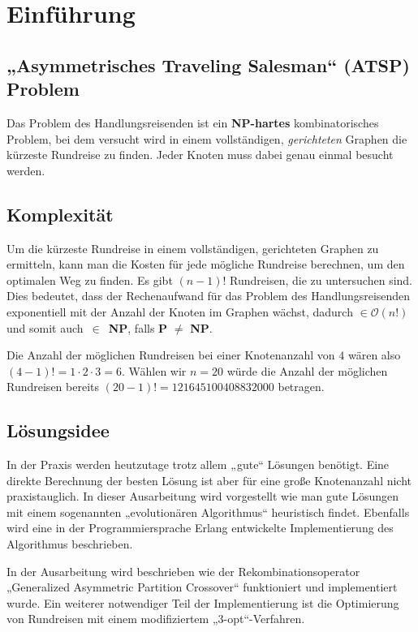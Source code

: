 \chapter{Einführung}
\section{„Asymmetrisches Traveling Salesman“ (ATSP) Problem}
Das Problem des Handlungsreisenden ist ein
\textbf{NP-hartes}\cite{exakte_algo} kombinatorisches Problem, bei dem versucht wird in
einem vollständigen, \textit{gerichteten} Graphen die kürzeste Rundreise zu
finden. Jeder Knoten muss dabei genau einmal besucht werden.

\section{Komplexität}
Um die kürzeste Rundreise in einem vollständigen, gerichteten Graphen zu
ermitteln, kann man die Kosten für jede mögliche Rundreise berechnen,
um den optimalen Weg zu finden. Es gibt $(n-1)!$
Rundreisen, die zu untersuchen sind\cite{pursuit}. Dies bedeutet, dass 
der Rechenaufwand für das Problem 
des Handlungsreisenden exponentiell mit der Anzahl der Knoten im Graphen
wächst, dadurch $\in 
\mathcal{O}(n!)$ und somit auch~$\in$~\textbf{NP}, falls 
\textbf{P} $\neq$ \textbf{NP}.
\begin{bem}
Die Anzahl der möglichen Rundreisen bei einer Knotenanzahl von $4$ wären also
$(4-1)! = 1 \cdot 2 \cdot 3 = 6$. Wählen wir $n = 20$ würde die
Anzahl der möglichen Rundreisen bereits $(20-1)! =
121645100408832000$ betragen.
\end{bem}

\section{Lösungsidee}
In der Praxis werden heutzutage trotz allem „gute“ Lösungen benötigt.
Eine direkte Berechnung der besten Lösung ist aber für eine große
Knotenanzahl nicht praxistauglich. In dieser Ausarbeitung wird
vorgestellt wie man gute Lösungen mit einem sogenannten „evolutionären
Algorithmus“ heuristisch findet. Ebenfalls wird eine in der
Programmiersprache Erlang entwickelte Implementierung des Algorithmus 
beschrieben.

In der Ausarbeitung wird beschrieben wie der Rekombinationsoperator
„Generalized Asymmetric Partition Crossover“ funktioniert und
implementiert wurde.
Ein weiterer notwendiger Teil der Implementierung ist die Optimierung
von Rundreisen mit einem modifiziertem „3-opt“-Verfahren.
